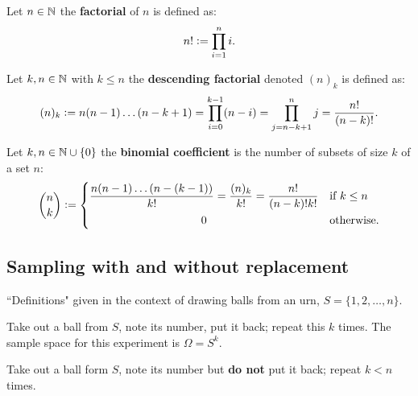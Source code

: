 \begingroup\belowdisplayskip=-0pt
    \begin{definition}[Factorial]
        Let $n\in\mathbb{N}$ the \textbf{factorial} of $n$ is defined as:
        \[
        n! := \prod_{i=1}^ni\textcolor{black}{.}
        \]
    \end{definition}
\endgroup

\begingroup\belowdisplayskip=-10pt
    \begin{definition}
        Let $k,n\in\mathbb{N}$ with $k\leq n$ the \textbf{descending factorial} denoted $(n)_k$ is defined as:
        \[
        (n)_k := n(n-1)\ldots(n-k+1) = \prod_{i=0}^{k-1}(n-i) = \prod_{j=n-k+1}^{n}j = \frac{n!}{(n-k)!}\textcolor{black}{.}
        \]
    \end{definition}
\endgroup

\begingroup\belowdisplayskip=-10pt
    \begin{definition}
        Let $k,n\in\mathbb{N}\cup \{0\}$ the \textbf{binomial coefficient} is the number of subsets of size $k$ of a set $n$:
        \[
        \binom{n}{k} := 
        \begin{dcases}
            \frac{n(n-1)\ldots(n-(k-1))}{k!} = \frac{(n)_k}{k!} = \frac{n!}{(n-k)!k!} & \textcolor{black}{\text{if }} k\leq n \\
            \omit\hfil$0$\hfil & \textcolor{black}{\text{otherwise.}}
        \end{dcases}
        \]
    \end{definition}
\endgroup

\subsection{Sampling with and without replacement}
``Definitions" given in the context of drawing balls from an urn, $S=\{1,2,\ldots,n\}$.
\begin{definition}
    Take out a ball from $S$, note its number, put it back; repeat this $k$ times. The sample space for this experiment is $\Omega = S^k$.
\begin{definition}
    Take out a ball form $S$, note its number but \textbf{do not} put it back; repeat $k<n$ times.
\end{definition}
\end{definition}
